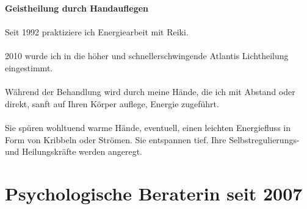 \documentclass[10pt,foldmark,notumble]{leaflet}
\begin{document}
\newpage
\vspace*{20mm}
{\large {\bf Geistheilung durch Handauflegen}\\
\vspace*{5mm}\\ 
Seit 1992 praktiziere ich Energie\-arbeit mit Reiki.\\ 
\\ 
2010 wurde ich in die höher und schnellerschwingende Atlantis Lichtheilung eingestimmt.\\
\\
Während der Behandlung wird durch meine Hände, die ich mit Abstand oder direkt, sanft auf Ihren Körper auflege, Energie zugeführt.\\
\\
Sie spüren wohltuend warme Hände, eventuell, einen \mbox{leichten} Energiefluss in Form von Kribbeln oder Strömen. Sie entspannen tief. Ihre Selbstregulierungs- und Heilungskräfte werden angeregt.

}




\newpage
\vspace*{15mm}
\section{Psychologische Beraterin seit 2007}
\end{document}

